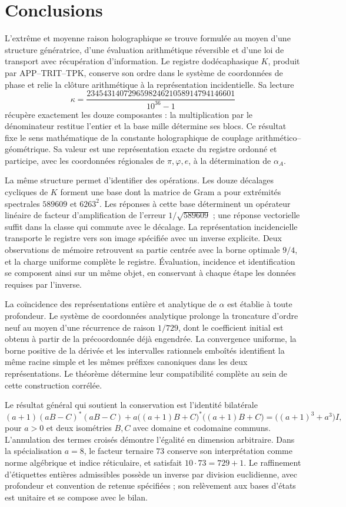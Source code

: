 \section{Conclusions}
\label{paper:conclusiones}
L’extrême et moyenne raison holographique se trouve formulée au moyen d’une structure génératrice, d’une évaluation arithmétique réversible et d’une loi de transport avec récupération d’information. Le registre dodécaphasique \(K\), produit par APP--TRIT--TPK, conserve son ordre dans le système de coordonnées de phase et relie la clôture arithmétique à la représentation incidentielle. Sa lecture
\[
\kappa=
\frac{234543140729659824621058914794146601}{10^{36}-1}
\]
récupère exactement les douze composantes : la multiplication par le dénominateur restitue l'entier et la base mille détermine ses blocs. Ce résultat fixe le sens mathématique de la constante holographique de couplage arithmético--géométrique. Sa valeur est une représentation exacte du registre ordonné et participe, avec les coordonnées régionales de \(\pi,\varphi,e\), à la détermination de \(\alpha_A\).

La même structure permet d’identifier des opérations. Les douze décalages cycliques de \(K\) forment une base dont la matrice de Gram a pour extrémités spectrales \(589609\) et \(6263^2\). Les réponses à cette base déterminent un opérateur linéaire de facteur d’amplification de l’erreur \(1/\sqrt{589609}\) ; une réponse vectorielle suffit dans la classe qui commute avec le décalage. La représentation incidencielle transporte le registre vers son image spécifiée avec un inverse explicite. Deux observations de mémoire retrouvent sa partie centrée avec la borne optimale \(9/4\), et la charge uniforme complète le registre. Évaluation, incidence et identification se composent ainsi sur un même objet, en conservant à chaque étape les données requises par l’inverse.

La coïncidence des représentations entière et analytique de \(\alpha\) est établie à toute profondeur. Le système de coordonnées analytique prolonge la troncature d’ordre neuf au moyen d’une récurrence de raison \(1/729\), dont le coefficient initial est obtenu à partir de la précoordonnée déjà engendrée. La convergence uniforme, la borne positive de la dérivée et les intervalles rationnels emboîtés identifient la même racine simple et les mêmes préfixes canoniques dans les deux représentations. Le théorème détermine leur compatibilité complète au sein de cette construction corrélée.

Le résultat général qui soutient la conservation est l'identité bilatérale
\[
 (a+1)(aB-C)^*(aB-C)
 +a\bigl((a+1)B+C\bigr)^*\bigl((a+1)B+C\bigr)
 =\bigl((a+1)^3+a^3\bigr)I,
\]
pour \(a>0\) et deux isométries \(B,C\) avec domaine et codomaine communs. L'annulation des termes croisés démontre l'égalité en dimension arbitraire. Dans la spécialisation \(a=8\), le facteur ternaire \(73\) conserve son interprétation comme norme algébrique et indice réticulaire, et satisfait \(10\cdot73=729+1\). Le raffinement d'étiquettes entières admissibles possède un inverse par division euclidienne, avec profondeur et convention de retenue spécifiées ; son relèvement aux bases d'états est unitaire et se compose avec le bilan.

